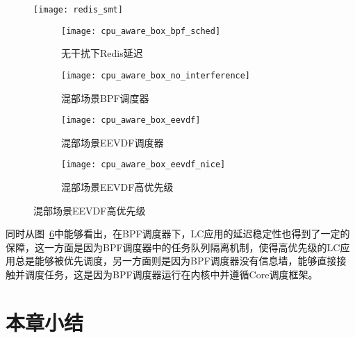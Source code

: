 \begin{figure}[!htbp]
    \centering
    \texttt{[image: redis\_smt]}
    \label{fig:redis_smt}
\end{figure}

\begin{figure}[H]
    \centering
    \begin{subfigure}[b]{0.49\textwidth}
        \texttt{[image: cpu\_aware\_box\_bpf\_sched]}
        \caption{无干扰下Redis延迟}
        \label{fig:cpu_aware_box_bpf_sched}
    \end{subfigure}
    \begin{subfigure}[b]{0.49\textwidth}
        \texttt{[image: cpu\_aware\_box\_no\_interference]}
        \caption{混部场景BPF调度器}
        \label{fig:cpu_aware_box_no_interference}
    \end{subfigure}
    \begin{subfigure}[b]{0.49\textwidth}
        \texttt{[image: cpu\_aware\_box\_eevdf]}
        \caption{混部场景EEVDF调度器}
        \label{fig:cpu_aware_box_eevdf}
    \end{subfigure}
    \begin{subfigure}[b]{0.49\textwidth}
        \texttt{[image: cpu\_aware\_box\_eevdf\_nice]}
        \caption{混部场景EEVDF高优先级}
        \label{fig:cpu_aware_box_eevdf_nice}
    \end{subfigure}
\label{fig:lc_box}
\end{figure}

同时从图~\ref{fig:lc_box}中能够看出，在BPF调度器下，LC应用的延迟稳定性也得到了一定的保障，这一方面是因为BPF调度器中的任务队列隔离机制，使得高优先级的LC应用总是能够被优先调度，另一方面则是因为BPF调度器没有信息墙，能够直接接触并调度任务，这是因为BPF调度器运行在内核中并遵循Core调度框架。



\section{本章小结}

